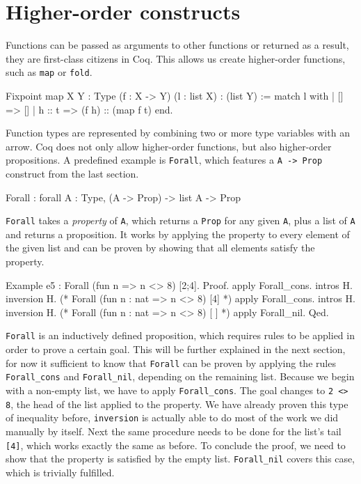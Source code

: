 \documentclass[fleqn]{scrreprt}
\newcommand{\todo}[1]{\marginpar{\textbf{TODO:} #1}}
\newcommand{\coqinline}[1]{\texttt{#1}}
\begin{document}
\section{Higher-order constructs}
Functions can be passed as arguments to other functions or returned as a result, they are first-class citizens in Coq. This allows us create higher-order functions, such as \coqinline{map} or \coqinline{fold}.
\todo{minted bug?}
\begin{coqcode}
Fixpoint map {X Y : Type} (f : X -> Y) (l : list X) : (list Y) :=
  match l with
  | []     => []
  | h :: t => (f h) :: (map f t)
  end.
\end{coqcode}
Function types are represented by combining two or more type variables with an arrow. Coq does not only allow higher-order functions, but also higher-order propositions. A predefined example is \coqinline{Forall}, which features a \coqinline{A -> Prop} construct from the last section.
\begin{coqcode}
Forall : forall A : Type, (A -> Prop) -> list A -> Prop
\end{coqcode}
\coqinline{Forall} takes a \textit{property} of \coqinline{A}, which returns a \coqinline{Prop} for any given \coqinline{A}, plus a list of \coqinline{A} and returns a proposition. It works by applying the property to every element of the given list and can be proven by showing that all elements satisfy the property.
\begin{coqcode}
Example e5 : Forall (fun n => n <> 8) [2;4].
Proof.
apply Forall_cons. intros H. inversion H.
(* Forall (fun n : nat => n <> 8) [4] *)
apply Forall_cons. intros H. inversion H.
(* Forall (fun n : nat => n <> 8) [ ] *)
apply Forall_nil.
Qed.
\end{coqcode}
\coqinline{Forall} is an inductively defined proposition, which requires rules to be applied in order to prove a certain goal. This will be further explained in the next section, for now it sufficient to know that \coqinline{Forall} can be proven by applying the rules \coqinline{Forall_cons} and \coqinline{Forall_nil}, depending on the remaining list. Because we begin with a non-empty list, we have to apply \coqinline{Forall_cons}. The goal changes to \coqinline{2 <> 8}, the head of the list applied to the property. We have already proven this type of inequality before, \coqinline{inversion} is actually able to do most of the work we did manually by itself. Next the same procedure needs to be done for the list's tail \coqinline{[4]}, which works exactly the same as before. To conclude the proof, we need to show that the property is satisfied by the empty list. \coqinline{Forall_nil} covers this case, which is trivially fulfilled.
\end{document}
